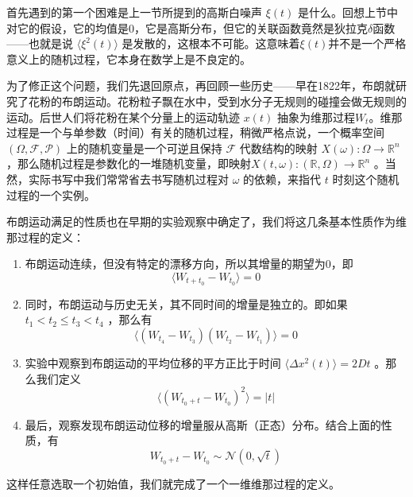 \documentclass{ctexart}
\begin{document}
首先遇到的第一个困难是上一节所提到的高斯白噪声 $\xi(t)$ 是什么。回想上节中对它的假设，它的均值是0，它是高斯分布，但它的关联函数竟然是狄拉克$\delta$函数——也就是说 $\langle\xi^2(t)\rangle$ 是发散的，这根本不可能。这意味着$\xi(t)$并不是一个严格意义上的随机过程，它本身在数学上是不良定的。

为了修正这个问题，我们先退回原点，再回顾一些历史——早在1822年，布朗就研究了花粉的布朗运动。花粉粒子飘在水中，受到水分子无规则的碰撞会做无规则的运动。后世人们将花粉在某个分量上的运动轨迹 $x(t)$ 抽象为维那过程$W_t$。维那过程是一个与单参数（时间）有关的随机过程，稍微严格点说，一个概率空间 $(\Omega,\mathcal{F},\mathcal{P})$ 上的随机变量是一个可逆且保持 $\mathcal{F}$ 代数结构的映射 $X(\omega):\Omega\to\mathbb{R}^n$ ，那么随机过程是参数化的一堆随机变量，即映射$X(t,\omega):(\mathbb{R},\Omega)\to\mathbb{R}^n$ 。当然，实际书写中我们常常省去书写随机过程对 $\omega$ 的依赖，来指代 $t$ 时刻这个随机过程的一个实例。

布朗运动满足的性质也在早期的实验观察中确定了，我们将这几条基本性质作为维那过程的定义：

\begin{enumerate}
\item 布朗运动连续，但没有特定的漂移方向，所以其增量的期望为0，即
\begin{equation}
\langle W_{t+t_0}-W_{t_0}\rangle=0
\end{equation}

\item 同时，布朗运动与历史无关，其不同时间的增量是独立的。即如果 $t_1<t_2\leq t_3<t_4$ ，那么有
\begin{equation}
\langle (W_{t_4}-W_{t_3})(W_{t_2}-W_{t_1})\rangle=0
\end{equation}

\item 实验中观察到布朗运动的平均位移的平方正比于时间 $\langle \Delta x^2(t)\rangle=2Dt$ 。那么我们定义
\begin{equation}
\langle (W_{t_0+t}-W_{t_0})^2\rangle=|t|
\end{equation}

\item 最后，观察发现布朗运动位移的增量服从高斯（正态）分布。结合上面的性质，有
\begin{equation}
W_{t_0+t}-W_{t_0}\sim \mathcal{N}(0,\sqrt{t})
\end{equation}

\end{enumerate}
这样任意选取一个初始值，我们就完成了一个一维维那过程的定义。
\end{document}

